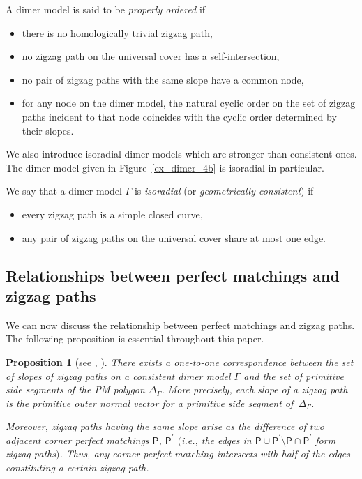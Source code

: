 \documentclass[11pt]{article}
\numberwithin{equation}{section}
\numberwithin{equation}{section}
\numberwithin{figure}{section}
\numberwithin{table}{section}
\newtheorem{Proposition}[Theorem]{Proposition}
 { \theoremstyle{definition}
\newtheorem{Definition}[Theorem]{Definition}
\newtheorem{Note}[Theorem]{Note}
\newtheorem{Example}[Theorem]{Example}
\newtheorem{Remark}[Theorem]{Remark}
\newtheorem{observation}[Theorem]{Observation}
\newtheorem{operation}[Theorem]{Operation}
\newtheorem{setting}[Theorem]{Setting}}
\newcommand{\sfP}{\mathsf{P}}
\begin{document}
\begin{Definition}\label{def_properly}
A dimer model is said to be \emph{properly ordered} if
\begin{itemize}\itemsep=0pt
\item [(1)] there is no homologically trivial zigzag path,
\item [(2)] no zigzag path on the universal cover has a self-intersection,
\item [(3)] no pair of zigzag paths with the same slope have a common node,
\item [(4)] for any node on the dimer model, the natural cyclic order on the set of zigzag paths incident to that node
coincides with the cyclic order determined by their slopes.
\end{itemize}
\end{Definition}

We also introduce isoradial dimer models which are stronger than consistent ones.
The dimer model given in Figure~\ref{ex_dimer_4b} is isoradial in particular.

\begin{Definition}
\label{def_isoradial}
We say that a dimer model $\Gamma$ is \emph{isoradial} (or \emph{geometrically consistent}) if
\begin{itemize}\itemsep=0pt
\item [(1)] every zigzag path is a simple closed curve,
\item [(2)] any pair of zigzag paths on the universal cover share at most one edge.
\end{itemize}
\end{Definition}

\subsection{Relationships between perfect matchings and zigzag paths}\label{subsec_relation_zigzag_pm}

We can now discuss the relationship between perfect matchings and zigzag paths.
The following proposition is essential throughout this paper.

\begin{Proposition}[{see \cite[Theorem~3.3 and Corollary~3.8]{Gul}, \cite[Proposition~9.2 and Corollary~9.3]{IU2}}]\label{zigzag_sidepolygon}
There exists a one-to-one correspondence between the set of slopes of zigzag paths on a consistent dimer model $\Gamma$ and
the set of primitive side segments of the PM polygon $\Delta_\Gamma$. More precisely, each slope of a zigzag path is the primitive outer normal vector for a primitive side segment of~$\Delta_\Gamma$.

Moreover, zigzag paths having the same slope arise as the difference of two adjacent corner perfect matchings $\sfP$, $\sfP^\prime$ $($i.e., the edges in $\sfP\cup\sfP^\prime{\setminus}\sfP\cap\sfP^\prime$ form zigzag paths$)$. Thus, any corner perfect matching intersects with half of the edges constituting a certain zigzag path.
\end{Proposition}
\end{document}
